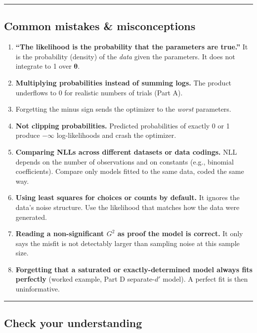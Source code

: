 \begin{center}\rule{0.5\linewidth}{0.5pt}\end{center}

\subsection{Common mistakes \& misconceptions}

\begin{enumerate}
\def\labelenumi{\arabic{enumi}.}
\tightlist
\item
  \textbf{``The likelihood is the probability that the parameters are
  true.''} It is the probability (density) of the \emph{data} given the
  parameters. It does not integrate to 1 over \(\boldsymbol\theta\).
\item
  \textbf{Multiplying probabilities instead of summing logs.} The
  product underflows to 0 for realistic numbers of trials (Part A).
\item
  Forgetting the minus sign sends the optimizer to the \emph{worst}
  parameters.
\item
  \textbf{Not clipping probabilities.} Predicted probabilities of
  exactly 0 or 1 produce \(-\infty\) log-likelihoods and crash the
  optimizer.
\item
  \textbf{Comparing NLLs across different datasets or data codings.} NLL
  depends on the number of observations and on constants (e.g., binomial
  coefficients). Compare only models fitted to the same data, coded the
  same way.
\item
  \textbf{Using least squares for choices or counts by default.} It
  ignores the data's noise structure. Use the likelihood that matches
  how the data were generated.
\item
  \textbf{Reading a non-significant \(G^2\) as proof the model is
  correct.} It only says the misfit is not detectably larger than
  sampling noise at this sample size.
\item
  \textbf{Forgetting that a saturated or exactly-determined model always
  fits perfectly} (worked example, Part D separate-\(d'\) model). A
  perfect fit is then uninformative.
\end{enumerate}

\begin{center}\rule{0.5\linewidth}{0.5pt}\end{center}

\subsection{Check your understanding}

